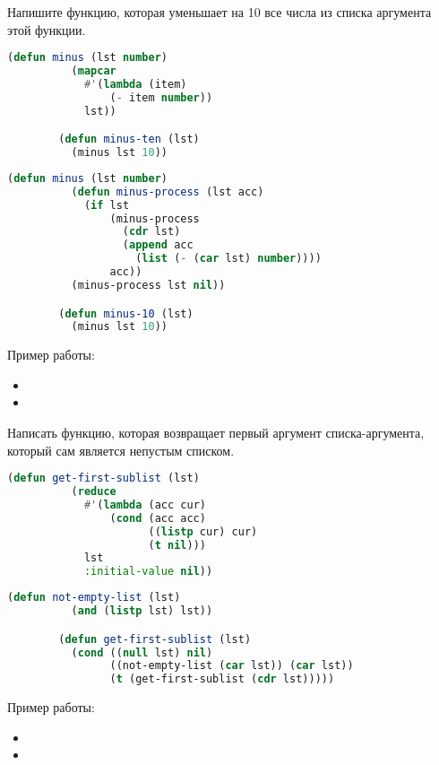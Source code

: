 \documentclass[a4paper,oneside,12pt]{extreport}
\begin{document}
\begin{task}
	Напишите функцию, которая уменьшает на 10 все числа из списка аргумента этой функции.

	\begin{lstlisting}[language=Lisp, gobble=16]
		(defun minus (lst number)
		  (mapcar
		    #'(lambda (item)
		        (- item number))
		    lst))

		(defun minus-ten (lst)
		  (minus lst 10))
	\end{lstlisting}

	\begin{lstlisting}[language=Lisp, gobble=16]
		(defun minus (lst number)
		  (defun minus-process (lst acc)
		    (if lst
		        (minus-process
		          (cdr lst)
		          (append acc
		            (list (- (car lst) number))))
		        acc))
		  (minus-process lst nil))

		(defun minus-10 (lst)
		  (minus lst 10))
	\end{lstlisting}

	Пример работы:
	\begin{itemize}
		\item {}
		\item {}
	\end{itemize}
\end{task}

\begin{task}
	Написать функцию, которая возвращает первый аргумент списка-аргумента, который сам является непустым списком.

	\begin{lstlisting}[language=Lisp, gobble=16]
		(defun get-first-sublist (lst)
		  (reduce
		    #'(lambda (acc cur)
		        (cond (acc acc)
		              ((listp cur) cur)
		              (t nil)))
		    lst
		    :initial-value nil))
	\end{lstlisting}

	\begin{lstlisting}[language=Lisp, gobble=16]
		(defun not-empty-list (lst)
		  (and (listp lst) lst))

		(defun get-first-sublist (lst)
		  (cond ((null lst) nil)
		        ((not-empty-list (car lst)) (car lst))
		        (t (get-first-sublist (cdr lst)))))
	\end{lstlisting}

	Пример работы:
	\begin{itemize}
		\item {}
		\item {}
	\end{itemize}
\end{task}
\end{document}
